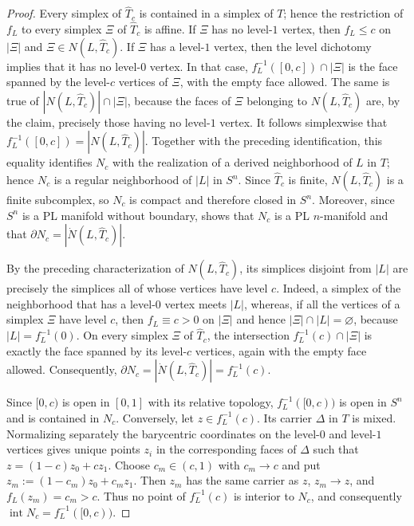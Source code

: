 \documentclass[12pt,oneside,a4paper]{article}
\theoremstyle{mytheorem}
\theoremstyle{remark}
\theoremstyle{definition}
\begin{document}
\begin{proof}
Every simplex of $\widehat T_c$ is contained in a simplex of $T$; hence
the restriction of $f_L$ to every simplex $\Xi$ of $\widehat T_c$ is
affine.  If $\Xi$ has no level-$1$ vertex, then $f_L\leq c$ on $|\Xi|$
and $\Xi\in N(L,\widehat T_c)$.  If $\Xi$ has a level-$1$ vertex, then
the level dichotomy implies that it has no level-$0$ vertex.  In that
case, $f_L^{-1}([0,c])\cap|\Xi|$ is the face spanned by the level-$c$
vertices of $\Xi$, with the empty face allowed.  The same is true of
$|N(L,\widehat T_c)|\cap|\Xi|$, because the faces of $\Xi$ belonging to
$N(L,\widehat T_c)$ are, by the claim, precisely those having no
level-$1$ vertex.  It follows simplexwise that
$f_L^{-1}([0,c])=|N(L,\widehat T_c)|$.
Together with the preceding identification, this equality identifies
$N_c$ with the realization of a derived neighborhood of $L$ in $T$;
hence $N_c$ is a regular neighborhood of $|L|$ in $S^n$.  Since
$\widehat T_c$ is finite, $N(L,\widehat T_c)$ is a finite subcomplex,
so $N_c$ is compact and therefore closed in $S^n$.  Moreover, since
$S^n$ is a PL manifold without boundary,
\cite[Theorem~3.6]{zbMATH01714503} shows that $N_c$ is a PL
$n$-manifold and that $\partial N_c=|\dot N(L,\widehat T_c)|$.

By the preceding characterization of $N(L,\widehat T_c)$, its
simplices disjoint from $|L|$ are precisely the simplices all of whose
vertices have level $c$.  Indeed, a simplex of the neighborhood that
has a level-$0$ vertex meets $|L|$, whereas, if all the vertices of a
simplex $\Xi$ have level $c$, then $f_L\equiv c>0$ on $|\Xi|$ and hence
$|\Xi|\cap|L|=\varnothing$, because $|L|=f_L^{-1}(0)$.  On every simplex $\Xi$ of
$\widehat T_c$, the intersection $f_L^{-1}(c)\cap|\Xi|$ is exactly the
face spanned by its level-$c$ vertices, again with the empty face
allowed.  Consequently,
$\partial N_c=|\dot N(L,\widehat T_c)|=f_L^{-1}(c)$.

Since $[0,c)$ is open in $[0,1]$ with its relative topology,
$f_L^{-1}([0,c))$ is open in $S^n$ and is contained in $N_c$.
Conversely, let $z\in f_L^{-1}(c)$.  Its carrier $\Delta$ in $T$ is
mixed.  Normalizing separately the barycentric coordinates on the
level-$0$ and level-$1$ vertices gives unique points $z_i$ in the
corresponding faces of $\Delta$ such that $z=(1-c)z_0+cz_1$.  Choose
$c_m\in(c,1)$ with $c_m\to c$ and put
$z_m:=(1-c_m)z_0+c_mz_1$.  Then $z_m$ has the same carrier as $z$,
$z_m\to z$, and $f_L(z_m)=c_m>c$.  Thus no point of
$f_L^{-1}(c)$ is interior to $N_c$, and consequently
$\operatorname{int}N_c=f_L^{-1}([0,c))$.


\end{proof}
\end{document}
